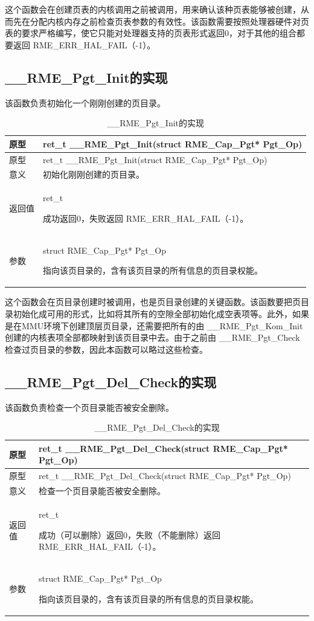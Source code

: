 这个函数会在创建页表的内核调用之前被调用，用来确认该种页表能够被创建，从而先在分配内核内存之前检查页表参数的有效性。该函数需要按照处理器硬件对页表的要求严格编写，使它只能对处理器支持的页表形式返回0，对于其他的组合都要返回 RME\_ERR\_HAL\_FAIL（-1）。

\subsection{\_\_RME\_Pgt\_Init的实现}\label{subsec:7-rme-pgt-init-implementation}

该函数负责初始化一个刚刚创建的页目录。

\begin{xltabular}{\textwidth}{@{}>{\hsize\raggedright\arraybackslash}X>{\hsize\raggedright\arraybackslash}X@{}}
\caption{\_\_RME\_Pgt\_Init的实现}\label{tab:7-77-rme-pgt-init-implementation}\\
\toprule
原型 & ret\_t \_\_RME\_Pgt\_Init(struct RME\_Cap\_Pgt*
Pgt\_Op)\tabularnewline
\endfirsthead
\toprule
原型 & ret\_t \_\_RME\_Pgt\_Init(struct RME\_Cap\_Pgt*
Pgt\_Op)\tabularnewline
\midrule
\endhead
\bottomrule
\endlastfoot
意义 & 初始化刚刚创建的页目录。\tabularnewline
返回值\strut
 & ret\_t

成功返回0，失败返回 RME\_ERR\_HAL\_FAIL（-1）。\strut
\tabularnewline
参数\strut
 & struct RME\_Cap\_Pgt* Pgt\_Op

指向该页目录的，含有该页目录的所有信息的页目录权能。\strut
\tabularnewline
\end{xltabular}

这个函数会在页目录创建时被调用，也是页目录创建的关键函数。该函数要把页目录初始化成可用的形式，比如将其所有的空隙全部初始化成空表项等。此外，如果是在MMU环境下创建顶层页目录，还需要把所有的由 \_\_RME\_Pgt\_Kom\_Init 创建的内核表项全部都映射到该页目录中去。由于之前由 \_\_RME\_Pgt\_Check 检查过页目录的参数，因此本函数可以略过这些检查。

\subsection{\_\_RME\_Pgt\_Del\_Check的实现}\label{subsec:7-rme-pgt-del-check-implementation}

该函数负责检查一个页目录能否被安全删除。

\begin{xltabular}{\textwidth}{@{}>{\hsize\raggedright\arraybackslash}X>{\hsize\raggedright\arraybackslash}X@{}}
\caption{\_\_RME\_Pgt\_Del\_Check的实现}\label{tab:7-78-rme-pgt-del-check-implementation}\\
\toprule
原型 & ret\_t \_\_RME\_Pgt\_Del\_Check(struct RME\_Cap\_Pgt*
Pgt\_Op)\tabularnewline
\endfirsthead
\toprule
原型 & ret\_t \_\_RME\_Pgt\_Del\_Check(struct RME\_Cap\_Pgt*
Pgt\_Op)\tabularnewline
\midrule
\endhead
\bottomrule
\endlastfoot
意义 & 检查一个页目录能否被安全删除。\tabularnewline
返回值\strut
 & ret\_t

成功（可以删除）返回0，失败（不能删除）返回 RME\_ERR\_HAL\_FAIL（-1）。\strut
\tabularnewline
参数\strut
 & struct RME\_Cap\_Pgt* Pgt\_Op

指向该页目录的，含有该页目录的所有信息的页目录权能。\strut
\tabularnewline
\end{xltabular}

